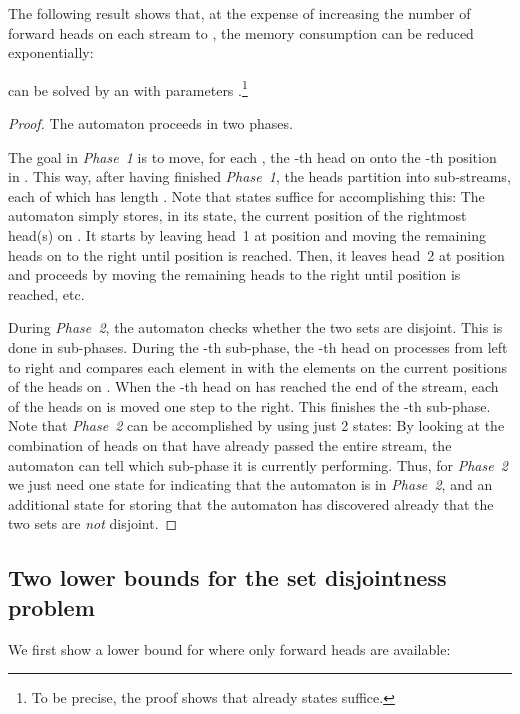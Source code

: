 \documentclass[proceedings]{stacs}
\theoremstyle{plain}\newtheorem{satz}[thm]{Satz}
\theoremstyle{definition}\newtheorem{crucial}[thm]{Crucial Definition}
\newcommand{\aut}{\text{mp2s-automaton}}
\newcommand{\auta}{\text{mp2s-automata}}
\begin{document}
The following result shows that, at the expense of increasing the number 
of forward heads on each stream to , the memory consumption can
be reduced exponentially:

\begin{proposition}\label{prop:upper-bound-sqrt}
  can be solved by an \aut{} with parameters
 .\footnote{To be precise, the proof shows that already 
     states suffice.}
\end{proposition}
\begin{proof}
The automaton proceeds in two phases. 

The goal in \emph{Phase~1} is to move, 
for each , the -th head on  onto
the -th position in . 
This way, after having finished \emph{Phase~1}, the heads 
partition  into  sub-streams, each of
which has length .
Note that  states suffice for accomplishing this: The automaton simply
stores, in its state, the current position of the rightmost head(s) on .
It starts by
leaving head~1 at position  and moving the remaining heads on 
to the right until position  is reached. 
Then, it leaves head~2 at position  and proceeds by moving the
remaining heads to the right until position  is reached, etc.

During \emph{Phase~2}, the automaton checks whether the two sets are disjoint.
This is done in  sub-phases. During the -th sub-phase, the
-th head on  processes  from left to right and compares
each element in  with the elements on the current positions of
the  heads on . When the -th head on  has 
reached the end of the stream, each of the heads on  is moved one
step to the right. This finishes the -th sub-phase.
Note that \emph{Phase~2} can be accomplished by using just 2 states:
By looking at the combination of heads on  that have already 
passed the entire stream, the automaton can tell which sub-phase it is 
currently performing. Thus, for \emph{Phase~2} we just need
one state for indicating that the automaton is in \emph{Phase~2}, 
and an additional state for storing that the
automaton has discovered already that the two sets are \emph{not} disjoint.
\end{proof}



\subsection{Two lower bounds for the set disjointness problem}\label{subsec:lowerbound}

We first show a lower bound for \auta{} where only forward heads are available:
\end{document}
